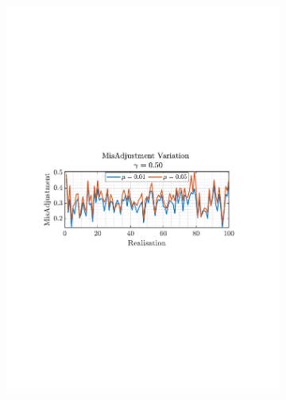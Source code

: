 \documentclass[12pt]{article}
\begin{document}
\begin{figure}[H]
				\begin{subfigure}{0.49\textwidth}
					\centering
					\includegraphics[trim={2.2cm 11.2cm 3.00cm  11.2cm}, clip, width=\textwidth]{../MATLAB/figures/q2_1f_fig04.pdf} 
					\captionsetup{justification=centering}
				\end{subfigure}
				\begin{subfigure}{0.49\textwidth}
					\centering

\end{subfigure}
\end{figure}
\end{document}
